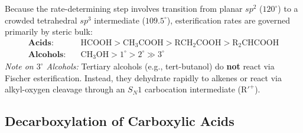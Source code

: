 \documentclass[10pt,twoside,openright]{book}
\begin{document}
\begin{usecasebox}
Because the rate-determining step involves transition from planar $sp^2$ ($120^\circ$) to a crowded tetrahedral $sp^3$ intermediate ($109.5^\circ$), esterification rates are governed primarily by steric bulk:
\begin{align*}
  \textbf{Acids:} \quad & \mathrm{HCOOH} > \mathrm{CH_3COOH} > \mathrm{RCH_2COOH} > \mathrm{R_2CHCOOH} \\
  \textbf{Alcohols:} \quad & \mathrm{CH_3OH} > 1^\circ > 2^\circ \gg 3^\circ
\end{align*}
\textit{Note on $3^\circ$ Alcohols:} Tertiary alcohols (e.g., tert-butanol) do \textbf{not} react via Fischer esterification. Instead, they dehydrate rapidly to alkenes or react via alkyl-oxygen cleavage through an $S_N1$ carbocation intermediate ($\mathrm{R'}^+$).
\end{usecasebox}

\subsection{Decarboxylation of Carboxylic Acids}
\end{document}
